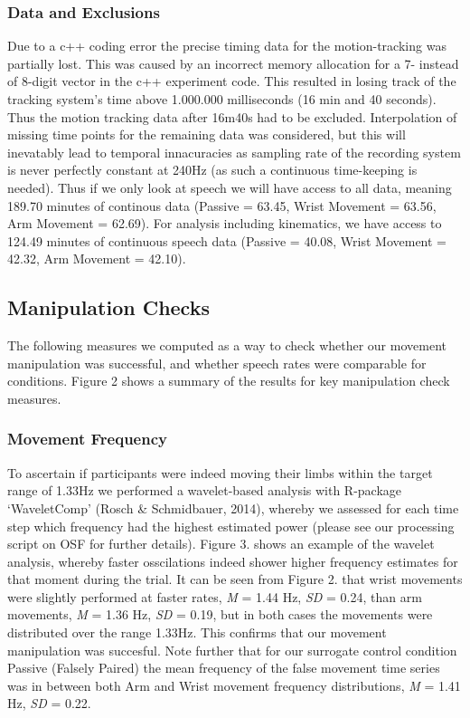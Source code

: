 \documentclass[
  man,floatsintext]{apa6}
\begin{document}
\hypertarget{data-and-exclusions}{%
\subsubsection{Data and Exclusions}\label{data-and-exclusions}}

Due to a c++ coding error the precise timing data for the motion-tracking was partially lost. This was caused by an incorrect memory allocation for a 7- instead of 8-digit vector in the c++ experiment code. This resulted in losing track of the tracking system's time above 1.000.000 milliseconds (16 min and 40 seconds). Thus the motion tracking data after 16m40s had to be excluded. Interpolation of missing time points for the remaining data was considered, but this will inevatably lead to temporal innacuracies as sampling rate of the recording system is never perfectly constant at 240Hz (as such a continuous time-keeping is needed). Thus if we only look at speech we will have access to all data, meaning 189.70 minutes of continous data (Passive = 63.45, Wrist Movement = 63.56, Arm Movement = 62.69). For analysis including kinematics, we have access to 124.49 minutes of continuous speech data (Passive = 40.08, Wrist Movement = 42.32, Arm Movement = 42.10).

\hypertarget{manipulation-checks}{%
\subsection{Manipulation Checks}\label{manipulation-checks}}

The following measures we computed as a way to check whether our movement manipulation was successful, and whether speech rates were comparable for conditions. Figure 2 shows a summary of the results for key manipulation check measures.

\hypertarget{movement-frequency}{%
\subsubsection{Movement Frequency}\label{movement-frequency}}

To ascertain if participants were indeed moving their limbs within the target range of 1.33Hz we performed a wavelet-based analysis with R-package `WaveletComp' (Rosch \& Schmidbauer, 2014), whereby we assessed for each time step which frequency had the highest estimated power (please see our processing script on OSF for further details). Figure 3. shows an example of the wavelet analysis, whereby faster osscilations indeed shower higher frequency estimates for that moment during the trial. It can be seen from Figure 2. that wrist movements were slightly performed at faster rates, \emph{M} = 1.44 Hz, \emph{SD} = 0.24, than arm movements, \emph{M} = 1.36 Hz, \emph{SD} = 0.19, but in both cases the movements were distributed over the range 1.33Hz. This confirms that our movement manipulation was succesful. Note further that for our surrogate control condition Passive (Falsely Paired) the mean frequency of the false movement time series was in between both Arm and Wrist movement frequency distributions, \emph{M} = 1.41 Hz, \emph{SD} = 0.22.
\end{document}
